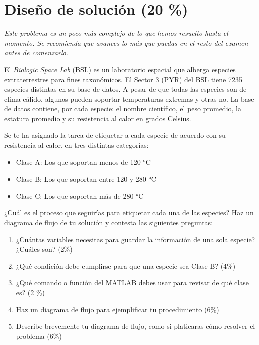 \documentclass[11pt]{article}
\begin{document}
\section{Diseño de solución (20 \%)}

{\footnotesize \it
Este problema es un poco más complejo de lo que hemos resuelto hasta el momento.
Se recomienda que avances lo más que puedas en el resto del examen antes de comenzarlo.
}

\bigskip

El \textit{Biologic Space Lab} (BSL) es un laboratorio espacial que alberga especies extraterrestres para fines taxonómicos.
El Sector 3 (PYR) del BSL tiene 7235 especies distintas en su base de datos. A pesar de que todas las especies son de clima cálido, algunos pueden soportar temperaturas extremas y otras no.
La base de datos contiene, por cada especie: el nombre científico, el peso promedio, la estatura promedio y su resistencia al calor en grados Celsius.

Se te ha asignado la tarea de etiquetar a cada especie de acuerdo con su resistencia al calor, en tres distintas categorías:

\begin{itemize}
    \item Clase A: Los que soportan menos de 120 °C
    \item Clase B: Los que soportan entre 120 y 280 °C
    \item Clase C: Los que soportan más de 280 °C
\end{itemize}

¿Cuál es el proceso que seguirías para etiquetar cada una de las especies?
Haz un diagrama de flujo de tu solución y contesta las siguientes preguntas:

\begin{enumerate}[label=\alph*)]
    \item ¿Cuántas variables necesitas para guardar la información de una sola especie? ¿Cuáles son? (2\%)
    \item ¿Qué condición debe cumplirse para que una especie sea Clase B? (4\%)
    \item ¿Qué comando o función del MATLAB debes usar para revisar de qué clase es? (2 \%)
    \item Haz un diagrama de flujo para ejemplificar tu procedimiento  (6\%)
    \item Describe brevemente tu diagrama de flujo, como si platicaras cómo resolver el problema (6\%)
\end{enumerate}
\end{document}
